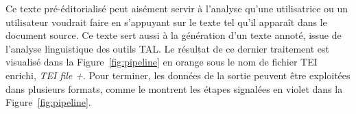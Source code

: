 \documentclass[class=article, crop=false]{standalone}
\begin{document}
Ce texte pré-éditorialisé peut aisément servir à l'analyse qu'une utilisatrice ou un utilisateur voudrait faire en s'appuyant sur le texte tel qu'il apparaît dans le document source. Ce texte sert aussi à la génération d'un texte annoté, issue de l'analyse linguistique des outils \acrshort{TAL}. Le résultat de ce dernier traitement est visualisé dans la Figure~\ref{fig:pipeline} en orange sous le nom de fichier \acrshort{TEI} enrichi, \textit{TEI file +}. Pour terminer, les données de la sortie peuvent être exploitées dans plusieurs formats, comme le montrent les étapes signalées en violet dans la Figure~\ref{fig:pipeline}.
\end{document}
